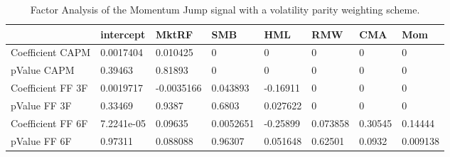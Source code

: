 \begin{table}[H]
\centering
\begin{tabular}{llllllll}
& intercept & MktRF & SMB & HML & RMW & CMA & Mom \\ 
\hline 
Coefficient CAPM & 0.0017404 & 0.010425 & 0 & 0 & 0 & 0 & 0 \\ 
pValue CAPM & 0.39463 & 0.81893 & 0 & 0 & 0 & 0 & 0 \\ 
Coefficient FF 3F & 0.0019717 & -0.0035166 & 0.043893 & -0.16911 & 0 & 0 & 0 \\ 
pValue FF 3F & 0.33469 & 0.9387 & 0.6803 & 0.027622 & 0 & 0 & 0 \\ 
Coefficient FF 6F & 7.2241e-05 & 0.09635 & 0.0052651 & -0.25899 & 0.073858 & 0.30545 & 0.14444 \\ 
pValue FF 6F & 0.97311 & 0.088088 & 0.96307 & 0.051648 & 0.62501 & 0.0932 & 0.009138 \\ 
\hline
\end{tabular}
\caption{Factor Analysis of the Momentum Jump signal with a volatility parity weighting scheme.}
\label{MOMJUMPVP_FACTOR}
\end{table}